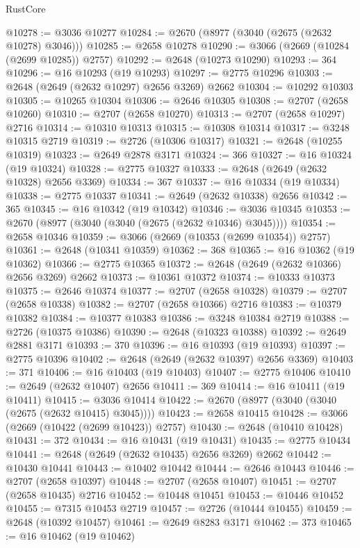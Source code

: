 \begin{lexlean}{RustCore}
\begin{coremodule}
@10278 := @3036 @10277
@10284 := @2670 (@8977 (@3040 (@2675 (@2632 @10278) @3046)))
@10285 := @2658 @10278
@10290 := @3066 (@2669 (@10284 (@2699 @10285)) @2757)
@10292 := @2648 (@10273 @10290)
@10293 := 364
@10296 := @16 @10293 (@19 @10293)
@10297 := @2775 @10296
@10303 := @2648 (@2649 (@2632 @10297) @2656 @3269) @2662
@10304 := @10292 @10303
@10305 := @10265 @10304
@10306 := @2646 @10305
@10308 := @2707 (@2658 @10260)
@10310 := @2707 (@2658 @10270)
@10313 := @2707 (@2658 @10297) @2716
@10314 := @10310 @10313
@10315 := @10308 @10314
@10317 := @3248 @10315 @2719
@10319 := @2726 (@10306 @10317)
@10321 := @2648 (@10255 @10319)
@10323 := @2649 @2878 @3171
@10324 := 366
@10327 := @16 @10324 (@19 @10324)
@10328 := @2775 @10327
@10333 := @2648 (@2649 (@2632 @10328) @2656 @3369)
@10334 := 367
@10337 := @16 @10334 (@19 @10334)
@10338 := @2775 @10337
@10341 := @2649 (@2632 @10338) @2656
@10342 := 365
@10345 := @16 @10342 (@19 @10342)
@10346 := @3036 @10345
@10353 := @2670 (@8977 (@3040 (@3040 (@2675 (@2632 @10346) @3045))))
@10354 := @2658 @10346
@10359 := @3066 (@2669 (@10353 (@2699 @10354)) @2757)
@10361 := @2648 (@10341 @10359)
@10362 := 368
@10365 := @16 @10362 (@19 @10362)
@10366 := @2775 @10365
@10372 := @2648 (@2649 (@2632 @10366) @2656 @3269) @2662
@10373 := @10361 @10372
@10374 := @10333 @10373
@10375 := @2646 @10374
@10377 := @2707 (@2658 @10328)
@10379 := @2707 (@2658 @10338)
@10382 := @2707 (@2658 @10366) @2716
@10383 := @10379 @10382
@10384 := @10377 @10383
@10386 := @3248 @10384 @2719
@10388 := @2726 (@10375 @10386)
@10390 := @2648 (@10323 @10388)
@10392 := @2649 @2881 @3171
@10393 := 370
@10396 := @16 @10393 (@19 @10393)
@10397 := @2775 @10396
@10402 := @2648 (@2649 (@2632 @10397) @2656 @3369)
@10403 := 371
@10406 := @16 @10403 (@19 @10403)
@10407 := @2775 @10406
@10410 := @2649 (@2632 @10407) @2656
@10411 := 369
@10414 := @16 @10411 (@19 @10411)
@10415 := @3036 @10414
@10422 := @2670 (@8977 (@3040 (@3040 (@2675 (@2632 @10415) @3045))))
@10423 := @2658 @10415
@10428 := @3066 (@2669 (@10422 (@2699 @10423)) @2757)
@10430 := @2648 (@10410 @10428)
@10431 := 372
@10434 := @16 @10431 (@19 @10431)
@10435 := @2775 @10434
@10441 := @2648 (@2649 (@2632 @10435) @2656 @3269) @2662
@10442 := @10430 @10441
@10443 := @10402 @10442
@10444 := @2646 @10443
@10446 := @2707 (@2658 @10397)
@10448 := @2707 (@2658 @10407)
@10451 := @2707 (@2658 @10435) @2716
@10452 := @10448 @10451
@10453 := @10446 @10452
@10455 := @7315 @10453 @2719
@10457 := @2726 (@10444 @10455)
@10459 := @2648 (@10392 @10457)
@10461 := @2649 @8283 @3171
@10462 := 373
@10465 := @16 @10462 (@19 @10462)

\end{coremodule}
\end{lexlean}
